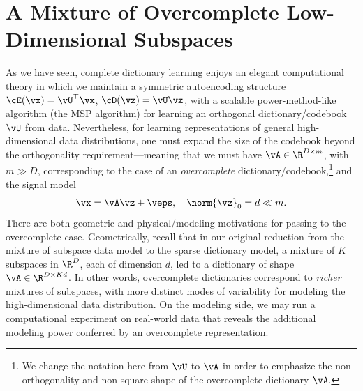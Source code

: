 \documentclass[../../book-main.tex]{subfiles}
\begin{document}
\section{A Mixture of Overcomplete Low-Dimensional Subspaces}
\label{sec:dictionary_learning}
As we have seen, complete dictionary learning enjoys an elegant computational theory in which we maintain a symmetric autoencoding structure $\cE(\vx) = \vU^\top \vx$, $\cD(\vz) = \vU \vz$, with a scalable power-method-like algorithm (the MSP algorithm) for learning an orthogonal dictionary/codebook $\vU$ from data. Nevertheless, for learning representations of general high-dimensional data distributions, one must expand the size of the codebook beyond the orthogonality requirement---meaning that we must have $\vA \in \R^{D \times m}$, with $m \gg D$, corresponding to the case of an \textit{overcomplete} dictionary/codebook,\footnote{We change the notation here from $\vU$ to $\vA$ in order to emphasize the non-orthogonality and non-square-shape of the overcomplete dictionary $\vA$.} and the signal model
\begin{equation}\label{eq:model-DL-overcomplete}
    \vx =  \vA \vz + \veps,
    \quad
    \norm{\vz}_0 = d \ll m.
\end{equation}
There are both geometric and physical/modeling motivations for passing to the overcomplete case. 
Geometrically, recall that in our original reduction from the mixture of subspace data model to the sparse dictionary model, a mixture of $K$ subspaces in $\R^D$, each of dimension $d$, led to a dictionary of shape $\vA \in \R^{D \times Kd}$.
In other words, overcomplete dictionaries correspond to \textit{richer} mixtures of subspaces, with more distinct modes of variability for modeling the high-dimensional data distribution.
On the modeling side, we may run a computational experiment on real-world data that reveals the additional modeling power conferred by an overcomplete representation.
\end{document}
